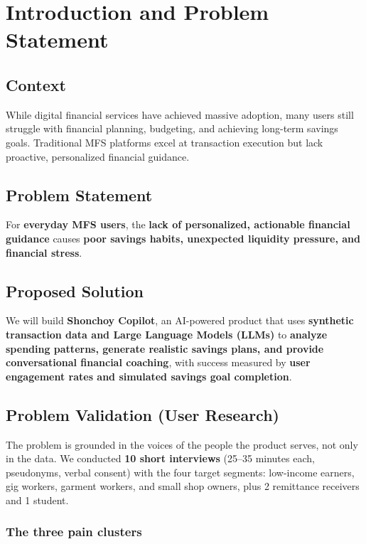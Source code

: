 \documentclass[11pt, a4paper]{article}
\begin{document}
\newpage

\section{Introduction and Problem Statement}
\subsection{Context}
While digital financial services have achieved massive adoption, many users still struggle with financial planning, budgeting, and achieving long-term savings goals. Traditional MFS platforms excel at transaction execution but lack proactive, personalized financial guidance.

\subsection{Problem Statement}
For \textbf{everyday MFS users}, the \textbf{lack of personalized, actionable financial guidance} causes \textbf{poor savings habits, unexpected liquidity pressure, and financial stress}. 

\subsection{Proposed Solution}
We will build \textbf{Shonchoy Copilot}, an AI-powered product that uses \textbf{synthetic transaction data and Large Language Models (LLMs)} to \textbf{analyze spending patterns, generate realistic savings plans, and provide conversational financial coaching}, with success measured by \textbf{user engagement rates and simulated savings goal completion}.


\subsection{Problem Validation (User Research)}
\label{sec:problem-validation}

The problem is grounded in the voices of the people the product serves, not only
in the data. We conducted \textbf{10 short interviews} (25--35 minutes each,
pseudonyms, verbal consent) with the four target segments: low-income earners,
gig workers, garment workers, and small shop owners, plus 2 remittance receivers
and 1 student.

\subsubsection*{The three pain clusters}
\end{document}
